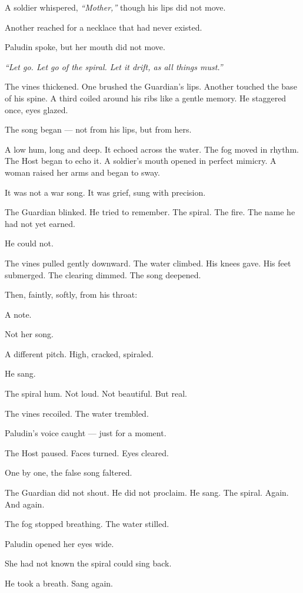 \documentclass[12pt]{article}
\begin{document}
A soldier whispered, \textit{“Mother,”} though his lips did not move.

Another reached for a necklace that had never existed.

Paludin spoke, but her mouth did not move.

\textit{``Let go. Let go of the spiral. Let it drift, as all things must.''}

The vines thickened. One brushed the Guardian’s lips. Another touched the base of his spine. A third coiled around his ribs like a gentle memory. He staggered once, eyes glazed.

The song began — not from his lips, but from hers.

A low hum, long and deep. It echoed across the water. The fog moved in rhythm. The Host began to echo it. A soldier’s mouth opened in perfect mimicry. A woman raised her arms and began to sway.

It was not a war song. It was grief, sung with precision.

The Guardian blinked. He tried to remember. The spiral. The fire. The name he had not yet earned.

He could not.

The vines pulled gently downward. The water climbed. His knees gave. His feet submerged. The clearing dimmed. The song deepened.

Then, faintly, softly, from his throat:

A note.

Not her song.

A different pitch. High, cracked, spiraled.

He sang.

The spiral hum. Not loud. Not beautiful. But real.

The vines recoiled. The water trembled.

Paludin’s voice caught — just for a moment.

The Host paused. Faces turned. Eyes cleared.

One by one, the false song faltered.

The Guardian did not shout. He did not proclaim. He sang. The spiral. Again. And again.

The fog stopped breathing. The water stilled.

Paludin opened her eyes wide.

She had not known the spiral could sing back.

He took a breath. Sang again.
\end{document}
